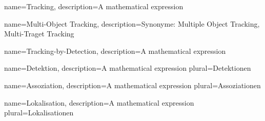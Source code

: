 {
        name=Tracking,
        description={A mathematical expression}
}

{
        name=Multi-Object Tracking,
        description={Synonyme: Multiple Object Tracking, Multi-Traget Tracking}
}

{
        name=Tracking-by-Detection,
        description={A mathematical expression}
}

{
        name=Detektion,
        description={A mathematical expression}
        plural=Detektionen
}

{
        name=Assoziation,
        description={A mathematical expression}
        plural=Assoziationen
}

{
        name=Lokalisation,
        description={A mathematical expression}
        plural=Lokalisationen
}


